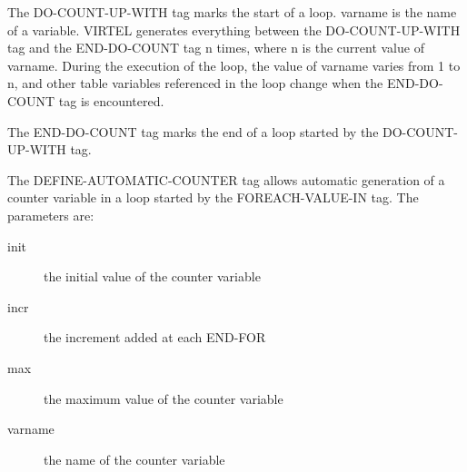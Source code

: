 \documentclass[letterpaper,10pt,english]{sphinxmanual}
\begin{document}
The DO-COUNT-UP-WITH tag marks the start of a loop. varname is the name of a variable. VIRTEL generates everything between the DO-COUNT-UP-WITH tag and the END-DO-COUNT tag n times, where n is the current value of varname. During the execution of the loop, the value of varname varies from 1 to n, and other table variables referenced in the loop change when the END-DO-COUNT tag is encountered.


\begin{sphinxVerbatim}[commandchars=\\\{\}]
 
\end{sphinxVerbatim}

The END-DO-COUNT tag marks the end of a loop started by the DO-COUNT-UP-WITH tag.


\begin{sphinxVerbatim}[commandchars=\\\{\}]
    
\end{sphinxVerbatim}

The DEFINE-AUTOMATIC-COUNTER tag allows automatic generation of a counter variable in a loop started by the FOREACH-VALUE-IN tag. The parameters are:
\begin{description}
\item[{init}] \leavevmode
the initial value of the counter variable

\item[{incr}] \leavevmode
the increment added at each END-FOR

\item[{max}] \leavevmode
the maximum value of the counter variable

\item[{varname}] \leavevmode
the name of the counter variable

\end{description}
\end{document}

